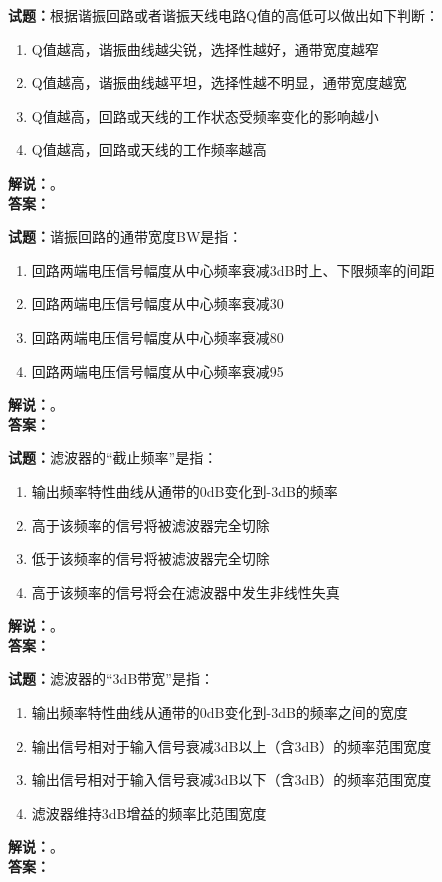 \documentclass{ctexbook}
\begin{document}
\bigskip

\noindent\textbf{试题：}根据谐振回路或者谐振天线电路Q值的高低可以做出如下判断：
\begin{enumerate}[leftmargin=3em]
  \item Q值越高，谐振曲线越尖锐，选择性越好，通带宽度越窄
  \item Q值越高，谐振曲线越平坦，选择性越不明显，通带宽度越宽
  \item Q值越高，回路或天线的工作状态受频率变化的影响越小
  \item Q值越高，回路或天线的工作频率越高
\end{enumerate}
\noindent\textbf{解说：}\textbf{}。\\\noindent\textbf{答案：}

\bigskip

\noindent\textbf{试题：}谐振回路的通带宽度BW是指：
\begin{enumerate}[leftmargin=3em]
  \item 回路两端电压信号幅度从中心频率衰减3dB时上、下限频率的间距
  \item 回路两端电压信号幅度从中心频率衰减30%
  \item 回路两端电压信号幅度从中心频率衰减80%
  \item 回路两端电压信号幅度从中心频率衰减95%
\end{enumerate}
\noindent\textbf{解说：}\textbf{}。\\\noindent\textbf{答案：}

\bigskip

\noindent\textbf{试题：}滤波器的“截止频率”是指：
\begin{enumerate}[leftmargin=3em]
  \item 输出频率特性曲线从通带的0dB变化到-3dB的频率
  \item 高于该频率的信号将被滤波器完全切除
  \item 低于该频率的信号将被滤波器完全切除
  \item 高于该频率的信号将会在滤波器中发生非线性失真
\end{enumerate}
\noindent\textbf{解说：}\textbf{}。\\\noindent\textbf{答案：}

\bigskip

\noindent\textbf{试题：}滤波器的“3dB带宽”是指：
\begin{enumerate}[leftmargin=3em]
  \item 输出频率特性曲线从通带的0dB变化到-3dB的频率之间的宽度
  \item 输出信号相对于输入信号衰减3dB以上（含3dB）的频率范围宽度
  \item 输出信号相对于输入信号衰减3dB以下（含3dB）的频率范围宽度
  \item 滤波器维持3dB增益的频率比范围宽度
\end{enumerate}
\noindent\textbf{解说：}\textbf{}。\\\noindent\textbf{答案：}
\end{document}
